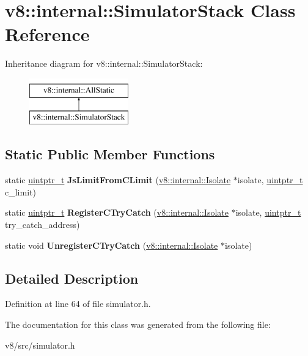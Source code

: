 \hypertarget{classv8_1_1internal_1_1SimulatorStack}{}\section{v8\+:\+:internal\+:\+:Simulator\+Stack Class Reference}
\label{classv8_1_1internal_1_1SimulatorStack}
Inheritance diagram for v8\+:\+:internal\+:\+:Simulator\+Stack\+:\begin{figure}[H]
\begin{center}
\leavevmode
\includegraphics[height=2.000000cm]{classv8_1_1internal_1_1SimulatorStack}
\end{center}
\end{figure}
\subsection*{Static Public Member Functions}
\begin{DoxyCompactItemize}
\item 
\mbox{\label{classv8_1_1internal_1_1SimulatorStack_af21f3a7909fe2ca5760b1cfe192f9fef}} 
static \mbox{\hyperlink{classuintptr__t}{uintptr\+\_\+t}} {\bfseries Js\+Limit\+From\+C\+Limit} (\mbox{\hyperlink{classv8_1_1internal_1_1Isolate}{v8\+::internal\+::\+Isolate}} $\ast$isolate, \mbox{\hyperlink{classuintptr__t}{uintptr\+\_\+t}} c\+\_\+limit)
\item 
\mbox{\label{classv8_1_1internal_1_1SimulatorStack_a6f431175b70dcc1afd95dcc3bc9905a7}} 
static \mbox{\hyperlink{classuintptr__t}{uintptr\+\_\+t}} {\bfseries Register\+C\+Try\+Catch} (\mbox{\hyperlink{classv8_1_1internal_1_1Isolate}{v8\+::internal\+::\+Isolate}} $\ast$isolate, \mbox{\hyperlink{classuintptr__t}{uintptr\+\_\+t}} try\+\_\+catch\+\_\+address)
\item 
\mbox{\label{classv8_1_1internal_1_1SimulatorStack_aba310aee87eed385313d42cbc30dcd8a}} 
static void {\bfseries Unregister\+C\+Try\+Catch} (\mbox{\hyperlink{classv8_1_1internal_1_1Isolate}{v8\+::internal\+::\+Isolate}} $\ast$isolate)
\end{DoxyCompactItemize}


\subsection{Detailed Description}


Definition at line 64 of file simulator.\+h.



The documentation for this class was generated from the following file\+:\begin{DoxyCompactItemize}
\item 
v8/src/simulator.\+h\end{DoxyCompactItemize}
